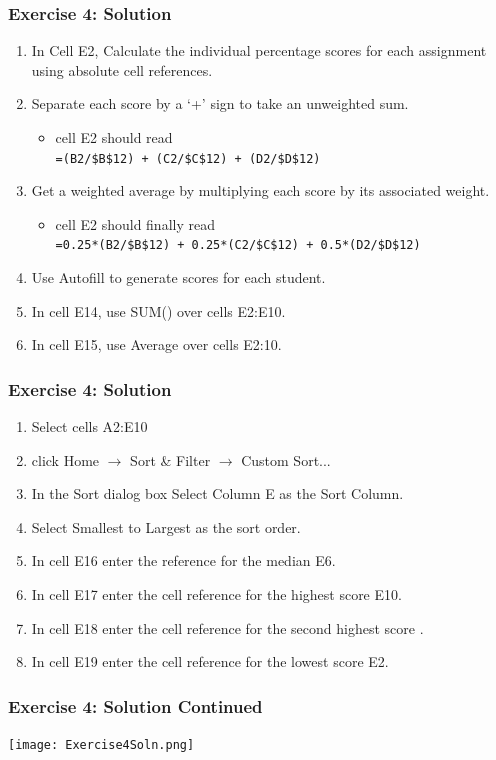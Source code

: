 \documentclass[12pt]{beamer}
\begin{document}
	\begin{frame}
		\frametitle{Exercise 4: Solution}
		\begin{enumerate}
			\item In Cell E2, Calculate the individual percentage scores for each assignment using absolute cell references.
			\item Separate each score by a `+' sign to take an unweighted sum.
				\begin{itemize}
					\item cell E2 should read\\ \texttt{=(B2/\$B\$12) + (C2/\$C\$12) + (D2/\$D\$12)}
				\end{itemize}
			\item Get a weighted average by multiplying each score by its associated weight. 
				\begin{itemize}
					\item cell E2 should finally read\\ \texttt{=0.25*(B2/\$B\$12) + 0.25*(C2/\$C\$12) + 0.5*(D2/\$D\$12)}
				\end{itemize}
				\item Use Autofill to generate scores for each student.
				\item In cell E14, use SUM() over cells E2:E10. 
				\item In cell E15, use Average over cells E2:10.
		\end{enumerate}
	\end{frame}
	\begin{frame}
		\frametitle{Exercise 4: Solution}
		\begin{enumerate} \item Select cells A2:E10
			\item click Home $\rightarrow$ Sort \& Filter $\rightarrow$ Custom Sort...
			\item In the Sort dialog box Select Column E as the Sort Column. 
			\item Select Smallest to Largest as the sort order.
			\item In cell E16 enter the reference for the median E6.
			\item In cell E17 enter the cell reference for the highest score E10.
			\item In cell E18 enter the cell reference for the second highest score .
			\item In cell E19 enter the cell reference for the lowest score E2.
		\end{enumerate}
	\end{frame}
	\begin{frame}
		\frametitle{Exercise 4: Solution Continued}
		\begin{center}
			\texttt{[image: Exercise4Soln.png]}
		\end{center}
	\end{frame}
\end{document}
